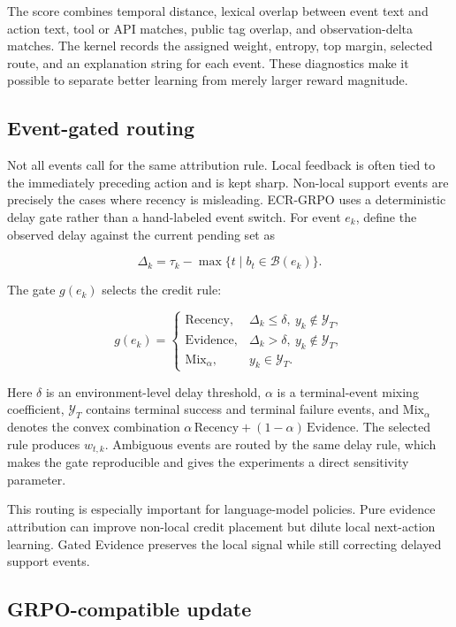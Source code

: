 \documentclass[letterpaper]{article} %
\begin{document}
The score combines temporal distance, lexical overlap between event text and action text, tool or API matches, public tag overlap, and observation-delta matches. The kernel records the assigned weight, entropy, top margin, selected route, and an explanation string for each event. These diagnostics make it possible to separate better learning from merely larger reward magnitude.

\subsection{Event-gated routing}

Not all events call for the same attribution rule. Local feedback is often tied to the immediately preceding action and is kept sharp. Non-local support events are precisely the cases where recency is misleading. ECR-GRPO uses a deterministic delay gate rather than a hand-labeled event switch. For event \(e_k\), define the observed delay against the current pending set as

\[
\Delta_k = \tau_k - \max\{t \mid b_t \in \mathcal{B}(e_k)\}.
\]

The gate \(g(e_k)\) selects the credit rule:

\[
g(e_k)=
\begin{cases}
\mathrm{Recency}, & \Delta_k \leq \delta,\ y_k \notin \mathcal{Y}_T, \\
\mathrm{Evidence}, & \Delta_k > \delta,\ y_k \notin \mathcal{Y}_T, \\
\mathrm{Mix}_{\alpha}, & y_k \in \mathcal{Y}_T .
\end{cases}
\]

Here \(\delta\) is an environment-level delay threshold, \(\alpha\) is a terminal-event mixing coefficient, \(\mathcal{Y}_T\) contains terminal success and terminal failure events, and \(\mathrm{Mix}_{\alpha}\) denotes the convex combination \(\alpha\,\mathrm{Recency}+(1-\alpha)\,\mathrm{Evidence}\). The selected rule produces \(w_{t,k}\). Ambiguous events are routed by the same delay rule, which makes the gate reproducible and gives the experiments a direct sensitivity parameter.

This routing is especially important for language-model policies. Pure evidence attribution can improve non-local credit placement but dilute local next-action learning. Gated Evidence preserves the local signal while still correcting delayed support events.

\subsection{GRPO-compatible update}
\end{document}

